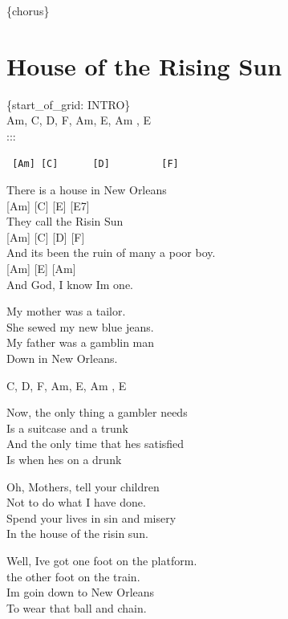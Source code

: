 \documentclass[
  letterpaper,
]{scrbook}
\begin{document}
\{chorus\}

\hypertarget{house-of-the-rising-sun}{%
\chapter{House of the Rising Sun}\label{house-of-the-rising-sun}}

\{start\_of\_grid: INTRO\}\\
Am, C, D, F, Am, E, Am , E\\
:::

\begin{verbatim}
 [Am] [C]      [D]         [F]
\end{verbatim}

There is a house in New Orleans\\
{[}Am{]} {[}C{]} {[}E{]} {[}E7{]}\\
They call the Risin\textquotesingle{} Sun\\
{[}Am{]} {[}C{]} {[}D{]} {[}F{]}\\
And it\textquotesingle s been the ruin of many a poor boy.\\
{[}Am{]} {[}E{]} {[}Am{]}\\
And God, I know I\textquotesingle m one.

My mother was a tailor.\\
She sewed my new blue jeans.\\
My father was a gamblin\textquotesingle{} man\\
Down in New Orleans.

C, D, F, Am, E, Am , E

Now, the only thing a gambler needs\\
Is a suitcase and a trunk\\
And the only time that he\textquotesingle s satisfied\\
Is when he\textquotesingle s on a drunk

Oh, Mothers, tell your children\\
Not to do what I have done.\\
Spend your lives in sin and misery\\
In the house of the risin\textquotesingle{} sun.

Well, I\textquotesingle ve got one foot on the platform.\\
the other foot on the train.\\
I\textquotesingle m goin\textquotesingle{} down to New Orleans\\
To wear that ball and chain.
\end{document}
